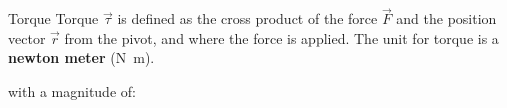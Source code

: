 \documentclass[12pt,compress,aspectratio=169]{beamer}
\begin{document}
\begin{frame}{Torque}
  Torque $\vec\tau$ is defined as the cross product of the force $\vec F$ and
  the position vector $\vec r$ from the pivot, and where the force is applied.
  The unit for torque is a \textbf{newton meter} (\si{\newton\metre}).


  \vspace{-.1in}with a magnitude of:


\end{frame}
\end{document}
